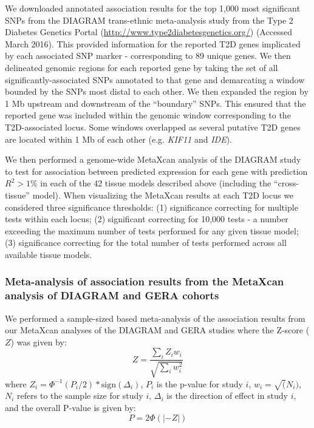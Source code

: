 \documentclass[10pt]{article}
\begin{document}
We downloaded annotated association results for the top 1,000 most significant SNPs from the DIAGRAM trans-ethnic meta-analysis study from the Type 2 Diabetes Genetics Portal (\url{http://www.type2diabetesgenetics.org/}) (Accessed March 2016). This provided information for the reported T2D genes implicated by each associated SNP marker - corresponding to 89 unique genes. We then delineated genomic regions for each reported gene by taking the set of all significantly-associated SNPs annotated to that gene and demarcating a window bounded by the SNPs most distal to each other. We then expanded the region by 1 Mb upstream and downstream of the ``boundary'' SNPs. This ensured that the reported gene was included within the genomic window corresponding to the T2D-associated locus. Some windows overlapped as several putative T2D genes are located within 1 Mb of each other (e.g. \textit{KIF11} and \textit{IDE}). 

We then performed a genome-wide MetaXcan analysis of the DIAGRAM study to test for association between predicted expression for each gene with prediction $R^2 > 1\%$ in each of the 42 tissue models described above (including the ``cross-tissue'' model). When visualizing the MetaXcan results at each T2D locus we considered three significance thresholds: (1) significance correcting for multiple tests within each locus; (2) significant correcting for 10,000 tests - a number exceeding the maximum number of tests performed for any given tissue model; (3) significance correcting for the total number of tests performed across all available tissue models. 


\subsubsection*{Meta-analysis of association results from the MetaXcan analysis of DIAGRAM and GERA cohorts}

We performed a sample-sized based meta-analysis \cite{Willer2010} of the association results from our MetaXcan analyses of the DIAGRAM and GERA studies where the Z-score ($Z$) was given by:
\begin{equation}
Z = \dfrac{\sum_{i}Z_{i}w_{i}}{\sqrt{\sum_{i}w_{i}^{2}}}
\end{equation}
where $Z_{i}=\Phi^{-1}(P_{i}/2)*\mathrm{sign}(\Delta_{i})$, $P_i$ is the p-value for study $i$, $w_i = \sqrt(N_i)$, $N_i$ refers to the sample size for study $i$, $\Delta_{i}$ is the direction of effect in study $i$, and the overall P-value is given by: 
\begin{equation}
P=2\Phi(|-Z|)
\end{equation} 
\end{document}

